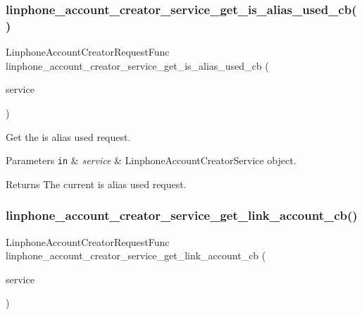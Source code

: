 \subsubsection{linphone\+\_\+account\+\_\+creator\+\_\+service\+\_\+get\+\_\+is\+\_\+alias\+\_\+used\+\_\+cb()}
{\footnotesize\ttfamily Linphone\+Account\+Creator\+Request\+Func linphone\+\_\+account\+\_\+creator\+\_\+service\+\_\+get\+\_\+is\+\_\+alias\+\_\+used\+\_\+cb (\begin{DoxyParamCaption}\item[{const \textbf{ Linphone\+Account\+Creator\+Service} $\ast$}]{service }\end{DoxyParamCaption})}



Get the is alias used request. 


\begin{DoxyParams}[1]{Parameters}
\mbox{\tt in}  & {\em service} & Linphone\+Account\+Creator\+Service object. \\
\hline
\end{DoxyParams}
\begin{DoxyReturn}{Returns}
The current is alias used request.  
\end{DoxyReturn}
\mbox{\label{group__account__creator__request_gaffd1c4446356e08faf2b8a40da706c3b}} 
\subsubsection{linphone\+\_\+account\+\_\+creator\+\_\+service\+\_\+get\+\_\+link\+\_\+account\+\_\+cb()}
{\footnotesize\ttfamily Linphone\+Account\+Creator\+Request\+Func linphone\+\_\+account\+\_\+creator\+\_\+service\+\_\+get\+\_\+link\+\_\+account\+\_\+cb (\begin{DoxyParamCaption}\item[{const \textbf{ Linphone\+Account\+Creator\+Service} $\ast$}]{service }\end{DoxyParamCaption})}



